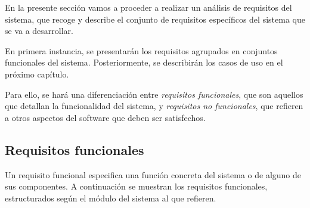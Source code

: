 
En la presente sección vamos a proceder a realizar un análisis de 
requisitos del sistema, que recoge y describe el conjunto 
de requisitos específicos del sistema que se va a desarrollar.\medskip

En primera instancia, se presentarán los requisitos agrupados en 
conjuntos funcionales del sistema. Posteriormente, se describirán 
los casos de uso en el próximo capítulo. \medskip

Para ello, se hará una diferenciación entre 
\textit{requisitos funcionales}, que son aquellos que detallan 
la funcionalidad del sistema, y \textit{requisitos no funcionales},
que refieren a otros aspectos del software que deben ser satisfechos.

\subsection{Requisitos funcionales}
Un requisito funcional especifica una función concreta del sistema o 
de alguno de sus componentes. A continuación se muestran los requisitos 
funcionales, estructurados según el módulo del sistema al que refieren.
        


        
